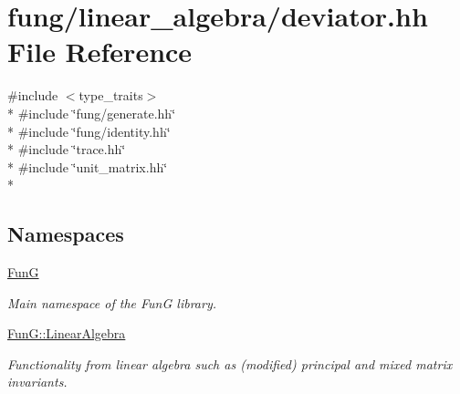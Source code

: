 \hypertarget{deviator_8hh}{}\section{fung/linear\+\_\+algebra/deviator.hh File Reference}
\label{deviator_8hh}
{\ttfamily \#include $<$type\+\_\+traits$>$}\\*
{\ttfamily \#include \char`\"{}fung/generate.\+hh\char`\"{}}\\*
{\ttfamily \#include \char`\"{}fung/identity.\+hh\char`\"{}}\\*
{\ttfamily \#include \char`\"{}trace.\+hh\char`\"{}}\\*
{\ttfamily \#include \char`\"{}unit\+\_\+matrix.\+hh\char`\"{}}\\*
\subsection*{Namespaces}
\begin{DoxyCompactItemize}
\item 
 \hyperlink{namespaceFunG}{Fun\+G}
\begin{DoxyCompactList}\small\item\em Main namespace of the Fun\+G library. \end{DoxyCompactList}\item 
 \hyperlink{namespaceFunG_1_1LinearAlgebra}{Fun\+G\+::\+Linear\+Algebra}
\begin{DoxyCompactList}\small\item\em Functionality from linear algebra such as (modified) principal and mixed matrix invariants. \end{DoxyCompactList}\end{DoxyCompactItemize}

